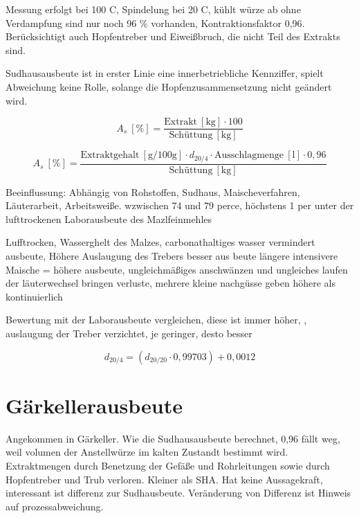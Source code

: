 \documentclass[a4paper,parskip=half]{scrartcl}
\newcommand{\ukg}{\:[\textrm{kg}]}
\newcommand{\uper}{\:[\textrm{\%}]}
\newcommand{\umper}{\:[\textrm{g/100g}]}
\newcommand{\uli}{\:[\text{l}]}
\begin{document}
Messung erfolgt bei 100 C, Spindelung bei 20 C, kühlt würze ab ohne Verdampfung sind nur noch 96 \% vorhanden, Kontraktionsfaktor 0,96. Berücksichtigt auch Hopfentreber und Eiweißbruch, die nicht Teil des Extrakts sind. 

Sudhausausbeute ist in erster Linie eine innerbetriebliche Kennziffer, spielt Abweichung keine Rolle, solange die Hopfenzusammensetzung nicht geändert wird.

\begin{equation}
A_s \uper = \frac{\text{Extrakt} \ukg \cdot 100}{\text{Schüttung} \ukg}
\label{eq:sha1}
\end{equation}


\begin{equation}
A_s \uper = \frac{\text{Extraktgehalt} \umper \cdot d_{20/4} \cdot \text{Ausschlagmenge} \uli \cdot 0,96}{\text{Schüttung} \ukg}
\label{eq:sha2}
\end{equation}

Beeinflussung:
Abhängig von Rohstoffen, Sudhaus, Maischeverfahren, Läuterarbeit, Arbeitsweiße. wzwischen 74 und 79 perce,
höchstens 1 per unter der lufttrockenen Laborausbeute des Mazlfeinmehles

Lufftrocken, Wasserghelt des Malzes, carbonathaltiges wasser vermindert ausbeute,
Höhere Auslaugung des Trebers besser aus beute
längere intensivere Maische = höhere ausbeute, 
ungleichmäßiges anschwänzen und ungleiches laufen der läuterwechsel bringen verluste, mehrere kleine nachgüsse geben höhere als kontinuierlich

Bewertung
mit der Laborausbeute vergleichen, diese ist immer höher, , auslaugung der Treber verzichtet,
je geringer, desto besser

\begin{equation}
d_{20/4} = (d_{20/20} \cdot 0,99703) + 0,0012
\label{eq:d204}
\end{equation}

\parencite{Rokweiler2019}

\section*{Gärkellerausbeute}

\parencite[432\psq]{Kunze2016}

Angekommen in Gärkeller. Wie die Sudhausausbeute berechnet, 0,96 fällt weg, weil volumen der Anstellwürze im kalten Zustandt bestimmt wird. Extraktmengen durch Benetzung der Gefäße und Rohrleitungen sowie durch Hopfentreber und Trub verloren. Kleiner als SHA. Hat keine Aussagekraft, interessant ist differenz zur Sudhausbeute. Veränderung von Differenz ist Hinweis auf prozessabweichung.
\end{document}
